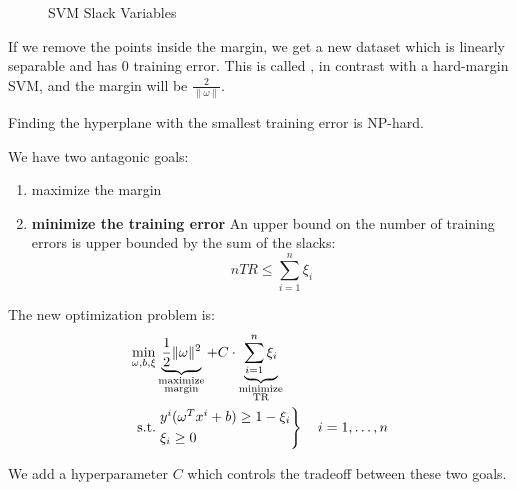 \begin{figure}[H]
\caption{SVM Slack Variables}\label{fig:slack}
\end{figure}

If we remove the points inside the margin, we get a new dataset
which is linearly separable and has 0 training error. This is called
, in contrast with a hard-margin SVM, and
the margin will be $\frac{2}{\|\omega\|}$.

Finding the hyperplane with the smallest training error
is NP-hard.

We  have two antagonic goals:
\begin{enumerate}
	\item maximize the margin
	\item \textbf{minimize the training error} An upper bound on the
	      number of training errors is upper bounded by the sum of the slacks:
	      \begin{equation*}
		      n TR \leq \sum_{i=1}^n \xi_i
	      \end{equation*}
\end{enumerate}

The new optimization problem is:
\begin{align*}
	\min_{\omega, b, \xi} &
  \underbrace{\frac{1}{2} \|\omega\|^2}_{\substack{\text{maximize}\\\text{margin}}}
  + C \cdot \underbrace{\sum_{i=1}^n \xi_i}_{\substack{\text{minimize}\\\text{TR}}} \\
	\text{s.t.}           & \begin{rcases*}
		                        y^i (\omega^T x^i + b) \geq 1 - \xi_i \\
		                        \xi_i \geq 0
	                        \end{rcases*}
	\quad i=1,\dots,n
\end{align*}

We add a hyperparameter $C$ which controls the tradeoff between
these two goals.
